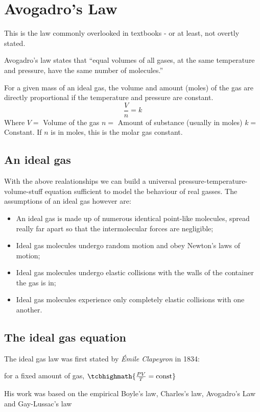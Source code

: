 \section{Avogadro's Law}

This is the law commonly overlooked in textbooks - or at least, not overtly stated. 
\begin{ilight}
    Avogadro's law states that ``equal volumes of all gases, at the same temperature and pressure, have the same number of molecules.''
\end{ilight}
For a given mass of an ideal gas, the volume and amount (moles) of the gas are directly proportional if the temperature and pressure are constant.
$$\frac{V}{n}=k$$
Where
$V=$ Volume of the gas
$n=$ Amount of substance (usually in moles)
$k=$ Constant. If $n$ is in moles, this is the molar gas constant.

\subsection{An ideal gas}

With the above realationships we can build a universal pressure-temperature-volume-stuff equation sufficient to model the behaviour of real gasses. The assumptions of an ideal gas however are: 
\begin{itemize}
    \item An ideal gas is made up of numerous identical point-like molecules, spread really far apart so that the intermolecular forces are negligible;
\item Ideal gas molecules undergo random motion and obey Newton's laws of motion;
\item Ideal gas molecules undergo elastic collisions with the walls of the container the gas is in;
\item Ideal gas molecules experience only completely elastic collisions with one another.

\end{itemize}
\subsection{The ideal gas equation}

The ideal gas law was first stated by \emph{\'Emile Clapeyron} in 1834:

for a fixed amount of gas, $\tcbhighmath{\frac{PV}{T} = \text{const}}$

His work was based on the empirical Boyle's law, Charles's law, Avogadro's Law and Gay-Lussac's law

